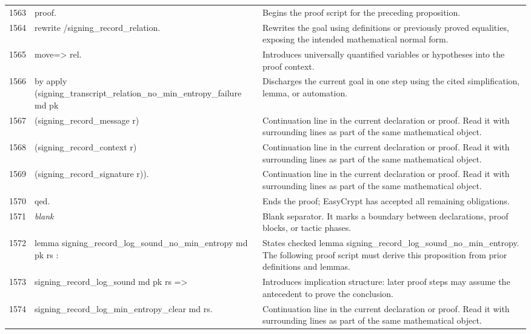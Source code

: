 \documentclass[10pt]{article}
\begin{document}
\begin{longtable}{r L{0.53\textwidth} L{0.37\textwidth}}
1563 & {\ttfamily\scriptsize proof.} & Begins the proof script for the preceding proposition. \\
1564 & {\ttfamily\scriptsize rewrite /signing\_record\_relation.} & Rewrites the goal using definitions or previously proved equalities, exposing the intended mathematical normal form. \\
1565 & {\ttfamily\scriptsize move=> rel.} & Introduces universally quantified variables or hypotheses into the proof context. \\
1566 & {\ttfamily\scriptsize by apply (signing\_transcript\_relation\_no\_min\_entropy\_failure md pk} & Discharges the current goal in one step using the cited simplification, lemma, or automation. \\
1567 & {\ttfamily\scriptsize             (signing\_record\_message r)} & Continuation line in the current declaration or proof.  Read it with surrounding lines as part of the same mathematical object. \\
1568 & {\ttfamily\scriptsize             (signing\_record\_context r)} & Continuation line in the current declaration or proof.  Read it with surrounding lines as part of the same mathematical object. \\
1569 & {\ttfamily\scriptsize             (signing\_record\_signature r)).} & Continuation line in the current declaration or proof.  Read it with surrounding lines as part of the same mathematical object. \\
1570 & {\ttfamily\scriptsize qed.} & Ends the proof; EasyCrypt has accepted all remaining obligations. \\
1571 & {\ttfamily\scriptsize \emph{blank}} & Blank separator.  It marks a boundary between declarations, proof blocks, or tactic phases. \\
1572 & {\ttfamily\scriptsize lemma signing\_record\_log\_sound\_no\_min\_entropy md pk rs :} & States checked lemma signing\_record\_log\_sound\_no\_min\_entropy.  The following proof script must derive this proposition from prior definitions and lemmas. \\
1573 & {\ttfamily\scriptsize   signing\_record\_log\_sound md pk rs =>} & Introduces implication structure: later proof steps may assume the antecedent to prove the conclusion. \\
1574 & {\ttfamily\scriptsize   signing\_record\_log\_min\_entropy\_clear md rs.} & Continuation line in the current declaration or proof.  Read it with surrounding lines as part of the same mathematical object. \\

\end{longtable}
\end{document}
